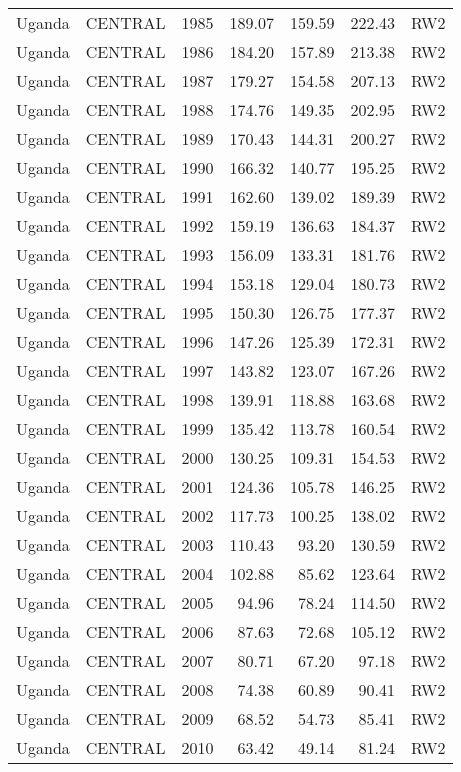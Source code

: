 \begin{longtable}{lllrrrl}
  Uganda & CENTRAL & 1985 & 189.07 & 159.59 & 222.43 & RW2 \\ 
  Uganda & CENTRAL & 1986 & 184.20 & 157.89 & 213.38 & RW2 \\ 
  Uganda & CENTRAL & 1987 & 179.27 & 154.58 & 207.13 & RW2 \\ 
  Uganda & CENTRAL & 1988 & 174.76 & 149.35 & 202.95 & RW2 \\ 
  Uganda & CENTRAL & 1989 & 170.43 & 144.31 & 200.27 & RW2 \\ 
  Uganda & CENTRAL & 1990 & 166.32 & 140.77 & 195.25 & RW2 \\ 
  Uganda & CENTRAL & 1991 & 162.60 & 139.02 & 189.39 & RW2 \\ 
  Uganda & CENTRAL & 1992 & 159.19 & 136.63 & 184.37 & RW2 \\ 
  Uganda & CENTRAL & 1993 & 156.09 & 133.31 & 181.76 & RW2 \\ 
  Uganda & CENTRAL & 1994 & 153.18 & 129.04 & 180.73 & RW2 \\ 
  Uganda & CENTRAL & 1995 & 150.30 & 126.75 & 177.37 & RW2 \\ 
  Uganda & CENTRAL & 1996 & 147.26 & 125.39 & 172.31 & RW2 \\ 
  Uganda & CENTRAL & 1997 & 143.82 & 123.07 & 167.26 & RW2 \\ 
  Uganda & CENTRAL & 1998 & 139.91 & 118.88 & 163.68 & RW2 \\ 
  Uganda & CENTRAL & 1999 & 135.42 & 113.78 & 160.54 & RW2 \\ 
  Uganda & CENTRAL & 2000 & 130.25 & 109.31 & 154.53 & RW2 \\ 
  Uganda & CENTRAL & 2001 & 124.36 & 105.78 & 146.25 & RW2 \\ 
  Uganda & CENTRAL & 2002 & 117.73 & 100.25 & 138.02 & RW2 \\ 
  Uganda & CENTRAL & 2003 & 110.43 & 93.20 & 130.59 & RW2 \\ 
  Uganda & CENTRAL & 2004 & 102.88 & 85.62 & 123.64 & RW2 \\ 
  Uganda & CENTRAL & 2005 & 94.96 & 78.24 & 114.50 & RW2 \\ 
  Uganda & CENTRAL & 2006 & 87.63 & 72.68 & 105.12 & RW2 \\ 
  Uganda & CENTRAL & 2007 & 80.71 & 67.20 & 97.18 & RW2 \\ 
  Uganda & CENTRAL & 2008 & 74.38 & 60.89 & 90.41 & RW2 \\ 
  Uganda & CENTRAL & 2009 & 68.52 & 54.73 & 85.41 & RW2 \\ 
  Uganda & CENTRAL & 2010 & 63.42 & 49.14 & 81.24 & RW2 \\ 

\end{longtable}
